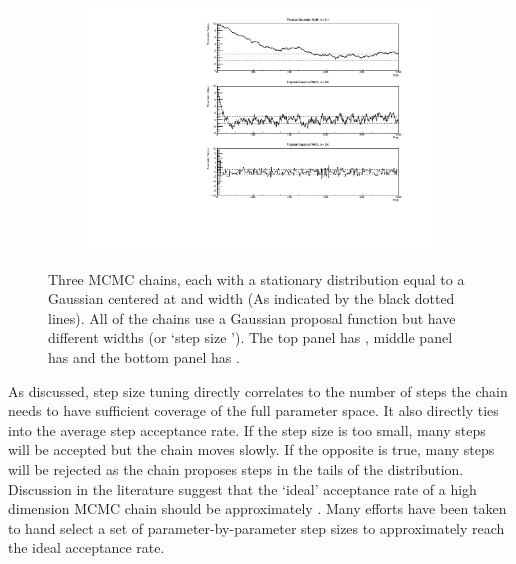 \begin{figure}[h]
  \begin{subfigure}[t]{\textwidth}
    \includegraphics[width=\textwidth, trim={10mm 0mm 18mm 0mm}, clip,page=1]{Figures/MCMC/MCMCTechnique_StepSizes.pdf}
  \end{subfigure}
  \caption{Three MCMC chains, each with a stationary distribution equal to a Gaussian centered at  and width  (As indicated by the black dotted lines). All of the chains use a Gaussian proposal function but have different widths (or `step size \quickmath{\sigma}'). The top panel has , middle panel has  and the bottom panel has .}
  \label{fig:MCMC_MCTechniqueStepSizeStudy}
\end{figure}

As discussed, step size tuning directly correlates to the number of steps the chain needs to have sufficient coverage of the full parameter space. It also directly ties into the average step acceptance rate. If the step size is too small, many steps will be accepted but the chain moves slowly. If the opposite is true, many steps will be rejected as the chain proposes steps in the tails of the distribution. Discussion in the literature  suggest that the `ideal' acceptance rate of a high dimension MCMC chain should be approximately . Many efforts have been taken to hand select a set of parameter-by-parameter step sizes to approximately reach the ideal acceptance rate.

